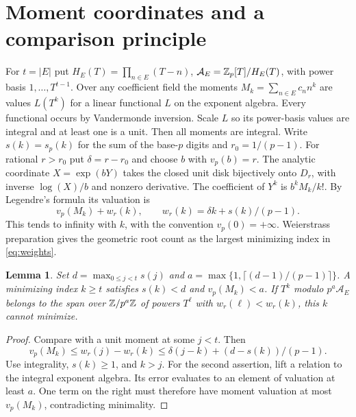 \documentclass[11pt,letterpaper]{article}
\newtheorem{lemma}[theorem]{Lemma}
\newcommand{\ord}{v_p}\newcommand{\ds}{s_p}
\begin{document}
\section{Moment coordinates and a comparison principle}
For $t=|E|$ put $H_E(T)=\prod_{n\in E}(T-n)$, $\mathcal A_E=\mathbb Z_p[T]/H_E(T)$, with power basis $1,\ldots,T^{t-1}$. Over any coefficient field the moments $M_k=\sum_{n\in E} c_n n^k$ are values $L(T^k)$ for a linear functional $L$ on the exponent algebra. Every functional occurs by Vandermonde inversion. Scale $L$ so its power-basis values are integral and at least one is a unit. Then all moments are integral. Write $s(k)=\ds(k)$ for the sum of the base-$p$ digits and $r_0=1/(p-1)$. For rational $r>r_0$ put $\delta=r-r_0$ and choose $b$ with $\ord(b)=r$. The analytic coordinate $X=\exp(bY)$ takes the closed unit disk bijectively onto $D_r$, with inverse $\log(X)/b$ and nonzero derivative. The coefficient of $Y^k$ is $b^k M_k/k!$. By Legendre's formula its valuation is
\begin{equation}\label{eq:weights}
 \ord(M_k)+w_r(k),\qquad w_r(k)=\delta k+s(k)/(p-1).
\end{equation}
This tends to infinity with $k$, with the convention $v_p(0)=+\infty$. Weierstrass preparation gives the geometric root count as the largest minimizing index in \eqref{eq:weights}.

\begin{lemma}\label{lem:compare}
Set $d=\max_{0\le j<t}s(j)$ and $a=\max\{1,\lceil(d-1)/(p-1)\rceil\}$. A minimizing index $k\ge t$ satisfies $s(k)<d$ and $\ord(M_k)<a$. If $T^k$ modulo $p^a\mathcal A_E$ belongs to the span over $\mathbb Z/p^a\mathbb Z$ of powers $T^\ell$ with $w_r(\ell)<w_r(k)$, this $k$ cannot minimize.
\end{lemma}
\begin{proof}
Compare with a unit moment at some $j<t$. Then
\[
 \ord(M_k)\le w_r(j)-w_r(k)
 \le \delta(j-k)+(d-s(k))/(p-1).
\]
Use integrality, $s(k)\ge1$, and $k>j$. For the second assertion, lift a relation to the integral exponent algebra. Its error evaluates to an element of valuation at least $a$. One term on the right must therefore have moment valuation at most $\ord(M_k)$, contradicting minimality.
\end{proof}
\end{document}
